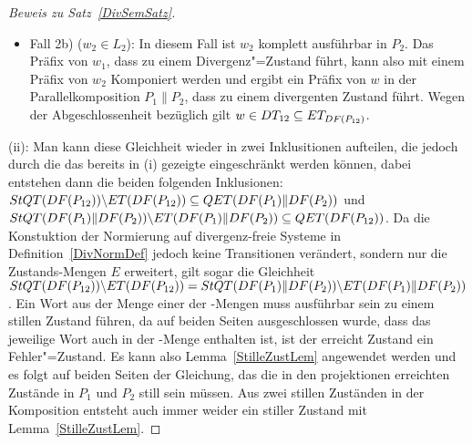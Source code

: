 \begin{proof}[Beweis zu Satz~\ref{DivSemSatz}]
\begin{itemize}
\begin{itemize}
          in der Komposition kommt, wird der divergente Zustand von $P_1$ an
          die Parallelkomposition $P_1\|P_2$ vererbt und durch die
          Abgeschlossenheit gegenüber \cont{} folgt dann $w\in\DT _{12}
          \subseteq \ET _{\DF (P_{12})}$. Falls es jedoch zu
          Sychnronisations"=Problemen wegen des nicht sichergestellten Input in
          $P_2$ im Wort $w_2$ kommt, entsteht in der Parallelkomposition ein
          Trace aus der Menge $\ET _{12} \subseteq \ET _{\DF (P_{12})}$ durch
          Satz~\ref{KommFehlerSemSatz}.1, da dann das Präfix von $w_1$, dass zu
          den Sychronsiations"=Problemen führt ausführbar ist und somit in der
          Sprache und auch der Fehler"=gefluteten Sprache enthalten ist.
        \item Fall 2b) ($w_2\in L_2$): In diesem Fall ist $w_2$ komplett
          ausführbar in $P_2$. Das Präfix von $w_1$, dass zu einem
          Divergenz"=Zustand führt, kann also mit einem Präfix von $w_2$
          Komponiert werden und ergibt ein Präfix von $w$ in der
          Parallelkomposition $P_1\|P_2$, dass zu einem divergenten Zustand
          führt. Wegen der Abgeschlossenheit bezüglich \cont{} gilt $w\in \DT
          _{12}\subseteq \ET _{\DF (P_{12})}$.
      \end{itemize}
  \end{itemize}

  (ii):
  Man kann diese Gleichheit wieder in zwei Inklusitionen aufteilen, die jedoch
  durch die das bereits in (i) gezeigte eingeschränkt werden können, dabei
  entstehen dann die beiden folgenden Inklusionen: $StQT (DF (P_{12}))
  \backslash ET (DF (P_{12})) \subseteq QET (DF (P_1)\|DF (P_2))$ und
  $StQT (DF (P_1)\|DF (P_2)) \backslash ET (DF (P_1)\|DF (P_2))
  \subseteq QET (DF (P_{12}))$. Da die Konstuktion der Normierung auf
  divergenz-freie Systeme in Definition~\ref{DivNormDef} jedoch keine
  Transitionen verändert, sondern nur die Zustands-Mengen $E$ erweitert, gilt
  sogar die Gleichheit $StQT (DF (P_{12})) \backslash ET (DF (P_{12})) =
  StQT (DF (P_1)\|DF (P_2)) \backslash ET (DF (P_1)\|DF (P_2))$. Ein Wort
  aus der Menge einer der \StQT{}-Mengen muss ausführbar sein zu einem stillen
  Zustand führen, da auf beiden Seiten ausgeschlossen wurde, dass das jeweilige
  Wort auch in der \ET{}-Menge enthalten ist, ist der erreicht Zustand ein
  Fehler"=Zustand. Es kann also Lemma~\ref{StilleZustLem} angewendet werden und
  es folgt auf beiden Seiten der Gleichung, das die in den projektionen
  erreichten Zustände in $P_1$ und $P_2$ still sein müssen. Aus zwei stillen
  Zuständen in der Komposition entsteht auch immer weider ein stiller Zustand
  mit Lemma~\ref{StilleZustLem}.


\end{proof}
